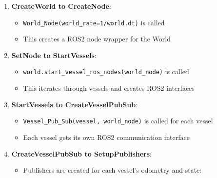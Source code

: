 \documentclass[
  letterpaper,
  DIV=11,
  numbers=noendperiod]{scrreprt}
\newenvironment{Shaded}{\begin{snugshade}}{\end{snugshade}}
\newcommand{\NormalTok}[1]{\textcolor[rgb]{0.00,0.23,0.31}{#1}}
\newcommand{\OperatorTok}[1]{\textcolor[rgb]{0.37,0.37,0.37}{#1}}
\newcommand{\VariableTok}[1]{\textcolor[rgb]{0.07,0.07,0.07}{#1}}
\providecommand{\tightlist}{%
  \setlength{\itemsep}{0pt}\setlength{\parskip}{0pt}}\usepackage{longtable,booktabs,array}
\begin{document}
\begin{enumerate}
  \begin{itemize}
  \item
    \texttt{process\_world\_input} creates vessel instances:

\begin{Shaded}
\begin{Highlighting}[]
\VariableTok{self}\NormalTok{.vessels.append(Vessel(vessel\_params}\OperatorTok{=}\NormalTok{vessel\_config,}
\NormalTok{                          hydrodynamic\_data}\OperatorTok{=}\NormalTok{hydrodynamic\_data,}
\NormalTok{                          vessel\_id}\OperatorTok{=}\NormalTok{agent\_count))}
\end{Highlighting}
\end{Shaded}
  \end{itemize}
\item
  \textbf{CreateWorld to CreateNode}:

  \begin{itemize}
  \tightlist
  \item
    \texttt{World\_Node(world\_rate=1/world.dt)} is called
  \item
    This creates a ROS2 node wrapper for the World
  \end{itemize}
\item
  \textbf{SetNode to StartVessels}:

  \begin{itemize}
  \tightlist
  \item
    \texttt{world.start\_vessel\_ros\_nodes(world\_node)} is called
  \item
    This iterates through vessels and creates ROS2 interfaces
  \end{itemize}
\item
  \textbf{StartVessels to CreateVesselPubSub}:

  \begin{itemize}
  \tightlist
  \item
    \texttt{Vessel\_Pub\_Sub(vessel,\ world\_node)} is called for each
    vessel
  \item
    Each vessel gets its own ROS2 communication interface
  \end{itemize}
\item
  \textbf{CreateVesselPubSub to SetupPublishers}:

  \begin{itemize}
  \item
    Publishers are created for each vessel's odometry and state:


\end{itemize}
\end{enumerate}
\end{document}
